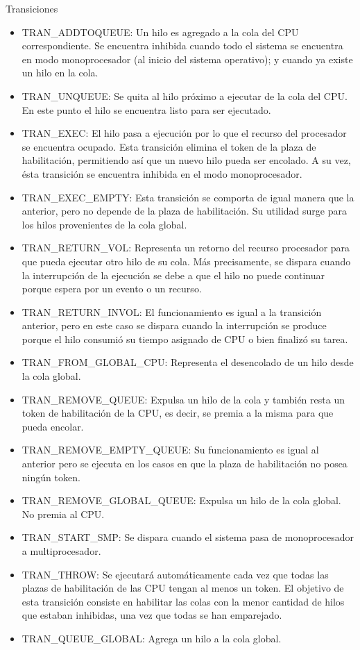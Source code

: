 Transiciones
\begin{itemize}
    \item TRAN\_ADDTOQUEUE: Un hilo es agregado a la cola del CPU correspondiente. Se encuentra inhibida cuando todo el sistema se encuentra en modo monoprocesador (al inicio del sistema operativo); y cuando ya existe un hilo en la cola.
    \item TRAN\_UNQUEUE: Se quita al hilo próximo a ejecutar de la cola del CPU. En este punto el hilo se encuentra listo para ser ejecutado.
    \item TRAN\_EXEC: El hilo pasa a ejecución por lo que el recurso del procesador se encuentra ocupado. Esta transición elimina el token de la plaza de habilitación, permitiendo así que un nuevo hilo pueda ser encolado. A su vez, ésta transición se encuentra inhibida en el modo monoprocesador.
    \item TRAN\_EXEC\_EMPTY: Esta transición se comporta de igual manera que la anterior, pero no depende de la plaza de habilitación. Su utilidad surge para los hilos provenientes de la cola global.
    \item TRAN\_RETURN\_VOL: Representa un retorno del recurso procesador para que pueda ejecutar otro hilo de su cola. Más precisamente, se dispara cuando la interrupción de la ejecución se debe a que el hilo no puede continuar porque espera por un evento o un recurso.
    \item TRAN\_RETURN\_INVOL: El funcionamiento es igual a la transición anterior, pero en este caso se dispara cuando la interrupción se produce porque el hilo consumió su tiempo asignado de CPU o bien finalizó su tarea.
    \item TRAN\_FROM\_GLOBAL\_CPU: Representa el desencolado de un hilo desde la cola global.
    \item TRAN\_REMOVE\_QUEUE: Expulsa un hilo de la cola y también resta un token de habilitación de la CPU, es decir, se premia a la misma para que pueda encolar.
    \item TRAN\_REMOVE\_EMPTY\_QUEUE: Su funcionamiento es igual al anterior pero se ejecuta en los casos en que la plaza de habilitación no posea ningún token.
    \item TRAN\_REMOVE\_GLOBAL\_QUEUE: Expulsa un hilo de la cola global. No premia al CPU.
    \item TRAN\_START\_SMP: Se dispara cuando el sistema pasa de monoprocesador a multiprocesador.
    \item TRAN\_THROW: Se ejecutará automáticamente cada vez que todas las plazas de habilitación de las CPU tengan al menos un token. El objetivo de esta transición consiste en habilitar las colas con la menor cantidad de hilos que estaban inhibidas, una vez que todas se han emparejado.
    \item TRAN\_QUEUE\_GLOBAL: Agrega un hilo a la cola global.
\end{itemize}


